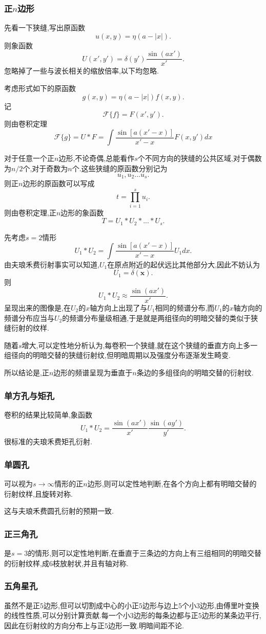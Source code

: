 \documentclass[10pt]{ctexart}
\begin{document}
\subsubsection{正$n$边形}
先看一下狭缝,写出原函数
$$u(x,y)=\eta(a-|x|).$$
则象函数
$$U(x',y')=\delta(y')\frac{\sin{(ax')}}{x'}.$$
忽略掉了一些与波长相关的缩放倍率,以下均忽略.

考虑形式如下的原函数
$$g(x,y)=\eta(a-|x|)f(x,y).$$
记
$$\mathcal{F}\{f\}=F(x',y').$$
则由卷积定理
$$\mathcal{F}\{g\}=U*F=\int\frac{\sin{[a(x'-x)]}}{x'-x}F(x,y')dx$$

对于任意一个正$n$边形,不论奇偶,总能看作$s$个不同方向的狭缝的公共区域,对于偶数为$n/2$个,对于奇数为$n$个.这些狭缝的原函数分别记为
$$u_1,u_2...u_s.$$
则正$n$边形的原函数可以写成
$$t=\displaystyle\prod_{i=1}^{s}u_i.$$
则由卷积定理,正$n$边形的象函数
$$T=U_1*U_2*...*U_s.$$

先考虑$s=2$情形
$$U_1*U_2=\int\frac{\sin{[a(x'-x)]}}{x'-x}U_1dx.$$
由夫琅禾费衍射事实可以知道,$U_1$在原点附近的起伏远比其他部分大,因此不妨认为
$$U_1=\delta(\bm{x}).$$
则
$$U_1*U_2\approx\frac{\sin{(ax')}}{x'}.$$
呈现出来的图像是,在$U_2$的$x$轴方向上出现了与$U_1$相同的频谱分布,而$U_1$的$x$轴方向的频谱分布应当与$U_2$的频谱分布量级相通,于是就是两组径向的明暗交替的类似于狭缝衍射的纹样.

随着$s$增大,可以定性地分析认为,每卷积一个狭缝,就在这个狭缝的垂直方向上多一组径向的明暗交替的狭缝衍射纹,但明暗周期以及强度分布逐渐发生畸变.

所以结论是,正$n$边形的频谱呈现为垂直于$n$条边的多组径向的明暗交替的衍射纹.
\subsubsection{单方孔与矩孔}
卷积的结果比较简单,象函数
$$U_1*U_2=\frac{\sin{(ax')}}{x'}\frac{\sin{(ay')}}{y'}.$$
很标准的夫琅禾费矩孔衍射.
\subsubsection{单圆孔}
可以视为$s\rightarrow\infty$情形的正$n$边形,则可以定性地判断,在各个方向上都有明暗交替的衍射纹样,且旋转对称.

这与夫琅禾费圆孔衍射的预期一致.
\subsubsection{正三角孔}
是$s=3$的情形,则可以定性地判断,在垂直于三条边的方向上有三组相同的明暗交替的衍射纹样,成6枝放射状,并且有轴对称.
\subsubsection{五角星孔}
虽然不是正$5$边形,但可以切割成中心的小正$5$边形与边上$5$个小$3$边形,由傅里叶变换的线性性质,可以分别计算贡献.每一个小$3$边形的每条边都与正$5$边形的某条边平行,因此在衍射纹的方向分布上与正$5$边形一致.明暗间距不论.
\end{document}
